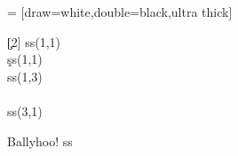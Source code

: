 \documentclass{article}
\newcommand\s{ss}
\begin{document}
	 = [draw=white,double=black,ultra thick]
	\begin{braid}[ABCD]
		\c[2] \s(1,1)	\\
		\c \s(1,1) \c	\\
		\s(1,3)			\\
		\c\c\f\c		\\
		\s(3,1)
	\end{braid}
	
	Ballyhoo! \s
\end{document}
